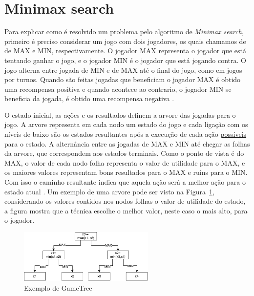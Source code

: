 \section{Minimax search}

Para explicar como é resolvido um problema pelo algoritmo de \textit{Minimax search}, primeiro é preciso considerar um jogo com dois jogadores, os quais chamamos de de MAX e MIN, respectivamente. 
O jogador MAX representa o jogador que está tentando ganhar o jogo, e o jogador MIN é o jogador que está jogando contra. 
O jogo alterna entre jogada de MIN e de MAX até o final do jogo, como em jogos por turnos. 
Quando são feitas jogadas que beneficiam o jogador MAX é obtido uma recompensa positiva e quando acontece ao contrario, o jogador MIN se beneficia da jogada, é obtido uma recompensa negativa \cite{intelligence2003modern}.
 
O estado inicial, as ações e os resultados definem a arvore das jogadas para o jogo. A arvore representa em cada nodo um estado do jogo e cada ligação com os níveis de baixo são os estados resultantes após a execução de cada ação \underline{possíveis} para o estado. 
A alternância entre as jogadas de MAX e MIN até chegar as folhas da arvore, que correspondem aos estados terminais.  
Como o ponto de vista é do MAX, o valor de cada nodo folha representa o valor de utilidade para o MAX, e os maiores valores representam bons resultados para o MAX e ruins para o MIN. 
Com isso o caminho resultante indica que aquela ação será a melhor ação para o estado atual \cite{intelligence2003modern}. 
Um exemplo de uma arvore pode ser visto na Figura~\ref{fig:gametree}, considerando os valores contidos nos nodos folhas o valor de utilidade do estado, a figura mostra que a técnica escolhe o melhor valor, neste caso o mais alto, para o jogador.  

\begin{figure}[ht]
	\centering
	\includegraphics[width=0.6\textwidth]{fig/gametree.pdf}
	\caption{Exemplo de GameTree}
	\label{fig:gametree}
\end{figure} 

